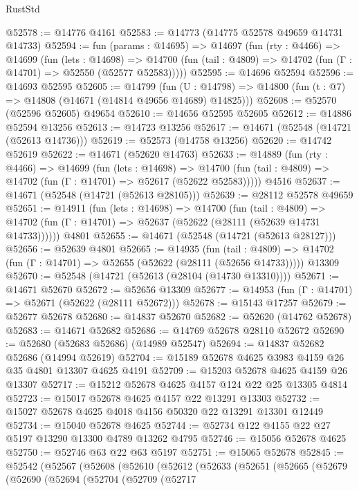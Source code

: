 \begin{lexlean}{RustStd}
\begin{coremodule}
@52578 := @14776 @4161
@52583 := @14773 (@14775 @52578 @49659 @14731 @14733)
@52594 := fun (params : @14695) =>
  @14697
    (fun (rty : @4466) =>
    @14699
      (fun (lets : @14698) =>
      @14700 (fun (tail : @4809) => @14702 (fun (Γ : @14701) => @52550 (@52577 @52583)))))
@52595 := @14696 @52594
@52596 := @14693 @52595
@52605 := @14799
    (fun (U : @14798) => @14800 (fun (t : @7) => @14808 (@14671 (@14814 @49656 @14689) @14825)))
@52608 := @52570 (@52596 @52605) @49654
@52610 := @14656 @52595 @52605
@52612 := @14886 @52594 @13256
@52613 := @14723 @13256
@52617 := @14671 (@52548 (@14721 (@52613 @14736)))
@52619 := @52573 (@14758 @13256)
@52620 := @14742 @52619
@52622 := @14671 (@52620 @14763)
@52633 := @14889
    (fun (rty : @4466) =>
    @14699
      (fun (lets : @14698) =>
      @14700 (fun (tail : @4809) => @14702 (fun (Γ : @14701) => @52617 (@52622 @52583)))))
    @4516
@52637 := @14671 (@52548 (@14721 (@52613 @28105)))
@52639 := @28112 @52578 @49659
@52651 := @14911
    (fun (lets : @14698) =>
    @14700
      (fun (tail : @4809) =>
      @14702 (fun (Γ : @14701) => @52637 (@52622 (@28111 (@52639 @14731 @14733))))))
    @4801
@52655 := @14671 (@52548 (@14721 (@52613 @28127)))
@52656 := @52639 @4801
@52665 := @14935
    (fun (tail : @4809) => @14702 (fun (Γ : @14701) => @52655 (@52622 (@28111 (@52656 @14733)))))
    @13309
@52670 := @52548 (@14721 (@52613 (@28104 (@14730 @13310))))
@52671 := @14671 @52670
@52672 := @52656 @13309
@52677 := @14953 (fun (Γ : @14701) => @52671 (@52622 (@28111 @52672)))
@52678 := @15143 @17257
@52679 := @52677 @52678
@52680 := @14837 @52670
@52682 := @52620 (@14762 @52678)
@52683 := @14671 @52682
@52686 := @14769 @52678 @28110 @52672
@52690 := @52680 (@52683 @52686) (@14989 @52547)
@52694 := @14837 @52682 @52686 (@14994 @52619)
@52704 := @15189 @52678 @4625 @3983 @4159 @26 @35 @4801 @13307 @4625 @4191
@52709 := @15203 @52678 @4625 @4159 @26 @13307
@52717 := @15212 @52678 @4625 @4157 @124 @22 @25 @13305 @4814
@52723 := @15017 @52678 @4625 @4157 @22 @13291 @13303
@52732 := @15027 @52678 @4625 @4018 @4156 @50320 @22 @13291 @13301 @12449
@52734 := @15040 @52678 @4625
@52744 := @52734 @122 @4155 @22 @27 @5197 @13290 @13300 @4789 @13262 @4795
@52746 := @15056 @52678 @4625
@52750 := @52746 @63 @22 @63 @5197
@52751 := @15065 @52678
@52845 := @52542
    (@52567
      (@52608
        (@52610
          (@52612
            (@52633
              (@52651
                (@52665
                  (@52679
                    (@52690
                      (@52694
                        (@52704
                          (@52709
                            (@52717

\end{coremodule}
\end{lexlean}
